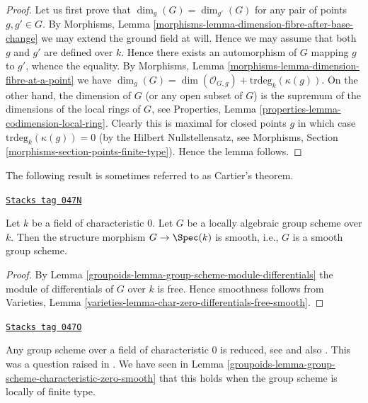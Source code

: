 \begin{proof}
Let us first prove that $\dim_g(G) = \dim_{g'}(G)$ for any
pair of points $g, g' \in G$. By
Morphisms, Lemma \ref{morphisms-lemma-dimension-fibre-after-base-change}
we may extend the ground field at will. Hence we may assume that
both $g$ and $g'$ are defined over $k$. Hence there exists an
automorphism of $G$ mapping $g$ to $g'$, whence the equality.
By
Morphisms, Lemma \ref{morphisms-lemma-dimension-fibre-at-a-point}
we have
$\dim_g(G) = \dim(\mathcal{O}_{G, g}) +
\text{trdeg}_k(\kappa(g))$.
On the other hand, the dimension of $G$ (or any open subset of $G$)
is the supremum of the dimensions of the local rings of $G$, see
Properties, Lemma \ref{properties-lemma-codimension-local-ring}.
Clearly this is maximal for closed points $g$ in which case
$\text{trdeg}_k(\kappa(g)) = 0$ (by the Hilbert Nullstellensatz, see
Morphisms, Section \ref{morphisms-section-points-finite-type}).
Hence the lemma follows.
\end{proof}

The following result is sometimes referred to as Cartier's theorem.

\begin{lemma}
\label{groupoids-lemma-group-scheme-characteristic-zero-smooth}
\href{https://stacks.math.columbia.edu/tag/047N}{\texttt{Stacks tag 047N}}

Let $k$ be a field of characteristic $0$. Let $G$ be a
locally algebraic group scheme over $k$. Then the structure
morphism $G \to \Spec(k)$ is smooth, i.e., $G$ is a smooth
group scheme.
\end{lemma}

\begin{proof}

By
Lemma \ref{groupoids-lemma-group-scheme-module-differentials}
the module of differentials of $G$ over $k$ is free.
Hence smoothness follows from
Varieties, Lemma \ref{varieties-lemma-char-zero-differentials-free-smooth}.
\end{proof}

\begin{remark}
\label{groupoids-remark-when-reduced}
\href{https://stacks.math.columbia.edu/tag/047O}{\texttt{Stacks tag 047O}}

Any group scheme over a field of characteristic $0$ is reduced, see
\cite[I, Theorem 1.1 and I, Corollary 3.9, and II, Theorem 2.4]{Perrin-thesis}
and also
\cite[Proposition 4.2.8]{Perrin}.
This was a question raised in
\cite[page 80]{Oort}.
We have seen in
Lemma \ref{groupoids-lemma-group-scheme-characteristic-zero-smooth}
that this holds when the group scheme is locally of finite type.
\end{remark}

